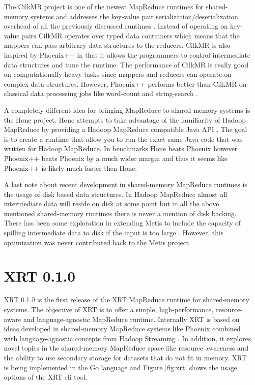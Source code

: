 \documentclass[twocolumn,11px]{article}       %
\begin{document}
The CilkMR project is one of the newest MapReduce runtimes for shared-memory
systems and addresses the key-value pair serialization/deserialization overhead
of all the previously discussed runtimes \cite{CilkMR}. Instead of operating on
key-value pairs CilkMR operates over typed data containers which means that the
mappers can pass arbitrary data structures to the reducers. CilkMR is also
inspired by Phoenix++ in that it allows the programmers to control intermediate
data structures and tune the runtime. The performance of CilkMR is really good
on computationally heavy tasks since mappers and reducers can operate on complex
data structures. However, Phoenix++ performs better than CilkMR on classical
data processing jobs like word-count and string-search \cite{CilkMR} \cite{GoogleMapReduce}.

A completely different idea for bringing MapReduce to shared-memory systems is
the Hone project. Hone attempts to take advantage of the familiarity of Hadoop
MapReduce by providing a Hadoop MapReduce compatible Java API
\cite{ScalingDown}. The goal is to create a runtime that allow you to run the
exact same Java code that was written for Hadoop MapReduce. In benchmarks Hone
beats Phoenix however Phoenix++ beats Phoenix by a much wider margin and thus it
seems like Phoenix++ is likely much faster then Hone.

A last note about recent development in shared-memory MapReduce runtimes is the
usage of disk based data structures. In Hadoop MapReduce almost all intermediate
data will reside on disk at some point but in all the above mentioned
shared-memory runtimes there is never a mention of disk backing. There has been
some exploration in extending Metis to include the capacity of spilling
intermediate data to disk if the input is too large \cite{DiskOptimization}.
However, this optimization was never contributed back to the Metis project.

\section{XRT 0.1.0} \label{sec:xrt}

XRT 0.1.0 is the first release of the XRT MapReduce runtime for shared-memory systems.
The objective of XRT is to offer a simple, high-performance, resource-aware and language-agnostic MapReduce runtime.
Internally XRT is based on ideas developed in shared-memory MapReduce systems like Phoenix \cite{Phoenix} combined with language-agnostic concepts from Hadoop Streaming \cite{HadoopStreaming}.
In addition, it explores novel topics in the shared-memory MapReduce space like resource awareness and the ability to use secondary storage for datasets that do not fit in memory.
XRT is being implemented in the Go language and Figure \ref{fig:xrt} shows the usage options of the XRT cli tool.
\end{document}
